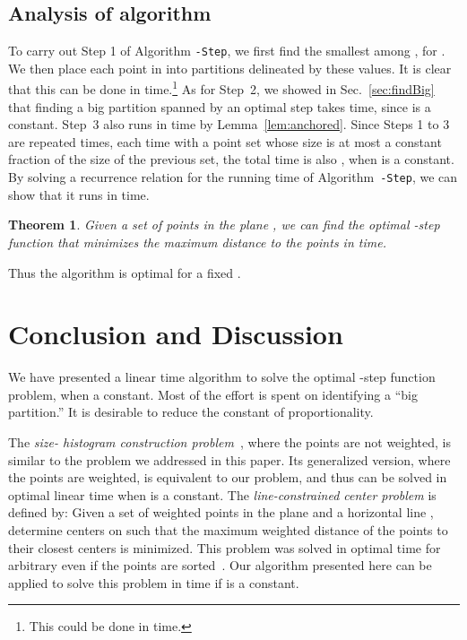 \documentclass[preprint,10pt]{elsarticle}
\newcommand{\QED}{\hfill}
\newtheorem{theorem}{Theorem}
\begin{document}
\subsection{Analysis of algorithm}
To carry out Step 1 of Algorithm {\tt -Step}, 
we first find the  smallest among ,
for .
We then place each point in  into  partitions delineated by these
 values.
It is clear that this can be done in  time.\footnote{This could be done in  time.}
As for Step~2,
we showed in Sec.~\ref{sec:findBig} that finding a big partition spanned by an optimal step
 takes  time, since  is a constant.
Step~3 also runs in  time by Lemma~\ref{lem:anchored}.
Since Steps 1 to 3 are repeated  times,
each time with a point set whose size is at most a constant fraction of the size of the previous set,
the total time is also , when  is a constant.
By solving a recurrence relation for the running time of Algorithm~{\tt -Step},
we can show that it runs in  time.

\begin{theorem}
Given a set of  points in the plane ,
we can find the optimal -step function that minimizes the maximum distance
to the  points in  time.
\QED
\end{theorem}
Thus the algorithm is optimal for a fixed .



\section{Conclusion and Discussion}\label{sec:conclusion}
We have presented a linear time algorithm to solve the optimal -step function problem,
when  a constant.
Most of the effort is spent on identifying a ``big partition.''
It is desirable to reduce the constant of proportionality. 

The {\em size- histogram construction problem}~\cite{guha2007},
where the points are not weighted, 
is similar to the problem we addressed in this paper.
Its generalized version,
where the points are weighted,
is equivalent to our problem, and thus can be solved in optimal linear time when  is a constant.
The {\em line-constrained  center problem} is defined by:
Given a set  of weighted points in the plane and a horizontal line ,
determine  centers on 
such that the maximum weighted distance of the points to their closest centers is minimized.
This problem was solved in optimal  time for arbitrary  even if the points
are sorted~\cite{karmakar2013,wang2014a}.
Our algorithm presented here can be applied to solve this problem 
in  time if  is a constant.
\end{document}
